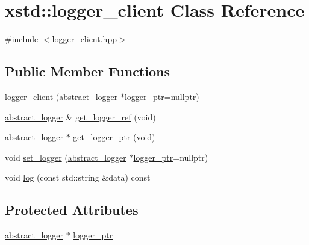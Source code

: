 \hypertarget{classxstd_1_1logger__client}{\section{xstd\-:\-:logger\-\_\-client Class Reference}
\label{classxstd_1_1logger__client}
}


{\ttfamily \#include $<$logger\-\_\-client.\-hpp$>$}

\subsection*{Public Member Functions}
\begin{DoxyCompactItemize}
\item 
\hyperlink{classxstd_1_1logger__client_ae366adb742d038fa072522500d798ce8}{logger\-\_\-client} (\hyperlink{classxstd_1_1abstract__logger}{abstract\-\_\-logger} $\ast$\hyperlink{classxstd_1_1logger__client_a6f1cc6e74cfa370ec516e3fa792b3f1c}{logger\-\_\-ptr}=nullptr)
\item 
\hyperlink{classxstd_1_1abstract__logger}{abstract\-\_\-logger} \& \hyperlink{classxstd_1_1logger__client_a4567aa30484c31b0d53089d1d08f8fab}{get\-\_\-logger\-\_\-ref} (void)
\item 
\hyperlink{classxstd_1_1abstract__logger}{abstract\-\_\-logger} $\ast$ \hyperlink{classxstd_1_1logger__client_a436c05e8f5d01fa5ed01aea36d1c5390}{get\-\_\-logger\-\_\-ptr} (void)
\item 
void \hyperlink{classxstd_1_1logger__client_a058f72e775905783e79721ecb2a65349}{set\-\_\-logger} (\hyperlink{classxstd_1_1abstract__logger}{abstract\-\_\-logger} $\ast$\hyperlink{classxstd_1_1logger__client_a6f1cc6e74cfa370ec516e3fa792b3f1c}{logger\-\_\-ptr}=nullptr)
\item 
void \hyperlink{classxstd_1_1logger__client_a7169793d2c5512150d611ae47e0c6b74}{log} (const std\-::string \&data) const 
\end{DoxyCompactItemize}
\subsection*{Protected Attributes}
\begin{DoxyCompactItemize}
\item 
\hyperlink{classxstd_1_1abstract__logger}{abstract\-\_\-logger} $\ast$ \hyperlink{classxstd_1_1logger__client_a6f1cc6e74cfa370ec516e3fa792b3f1c}{logger\-\_\-ptr}
\end{DoxyCompactItemize}


